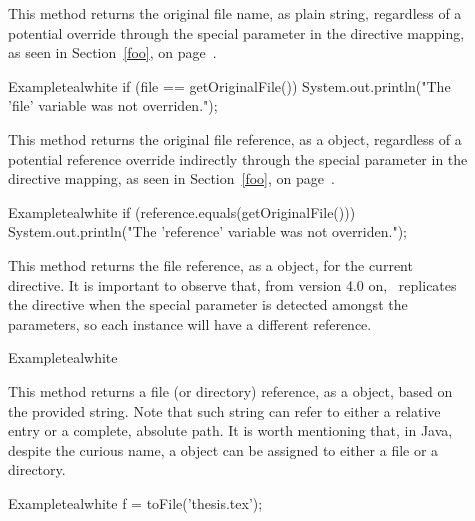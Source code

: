 \begin{description}
\item[] This method returns the original file name, as plain string, regardless of a potential override through the special  parameter in the directive mapping, as seen in Section~\ref{foo}, on page~\pageref{foo}.

\begin{codebox}{Example}{teal}{\icnote}{white}
if (file == getOriginalFile()) {
    System.out.println("The 'file' variable
       was not overriden.");
}
\end{codebox}

\item[] This method returns the original file reference, as a  object, regardless of a potential reference override indirectly through the special  parameter in the directive mapping, as seen in Section~\ref{foo}, on page~\pageref{foo}.

\begin{codebox}{Example}{teal}{\icnote}{white}
if (reference.equals(getOriginalFile())) {
    System.out.println("The 'reference' variable
       was not overriden.");
}
\end{codebox}

\item[] This method returns the file reference, as a  object, for the current directive. It is important to observe that, from version 4.0 on, \arara\ replicates the directive when the special  parameter is detected amongst the parameters, so each instance will have a different reference.

\begin{codebox}{Example}{teal}{\icnote}{white}
\end{codebox}

\item[] This method returns a file (or directory) reference, as a  object, based on the provided string. Note that such string can refer to either a relative entry or a complete, absolute path. It is worth mentioning that, in Java, despite the curious name, a  object can be assigned to either a file or a directory.

\begin{codebox}{Example}{teal}{\icnote}{white}
f = toFile('thesis.tex');
\end{codebox}


\end{description}



